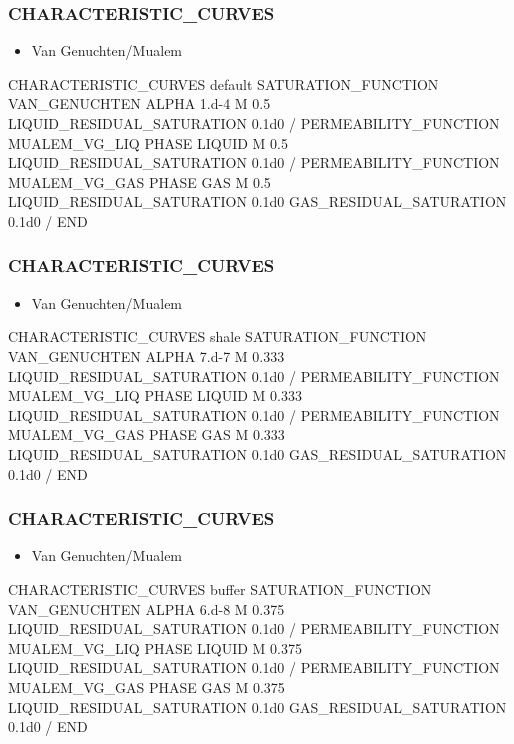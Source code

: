 \documentclass{beamer}
\newcommand\greencomment[1]{{{\color{green} #1}}}
\begin{document}
\begin{frame}\frametitle{CHARACTERISTIC\_CURVES}
\begin{itemize}
  \item Van Genuchten/Mualem
\end{itemize}
\begin{semiverbatim}\small
CHARACTERISTIC_CURVES \greencomment{default}
  SATURATION_FUNCTION VAN_GENUCHTEN
    ALPHA 1.d-4
    M 0.5
    LIQUID_RESIDUAL_SATURATION 0.1d0
  /
  PERMEABILITY_FUNCTION MUALEM_VG_LIQ
    PHASE LIQUID
    M 0.5
    LIQUID_RESIDUAL_SATURATION 0.1d0
  /
  PERMEABILITY_FUNCTION MUALEM_VG_GAS
    PHASE GAS
    M 0.5
    LIQUID_RESIDUAL_SATURATION 0.1d0
    GAS_RESIDUAL_SATURATION 0.1d0
  /
END
\end{semiverbatim}
\end{frame}

\begin{frame}\frametitle{CHARACTERISTIC\_CURVES}
\begin{itemize}
  \item Van Genuchten/Mualem
\end{itemize}
\begin{semiverbatim}\small
CHARACTERISTIC_CURVES \greencomment{shale}
  SATURATION_FUNCTION VAN_GENUCHTEN
    ALPHA 7.d-7
    M 0.333
    LIQUID_RESIDUAL_SATURATION 0.1d0
  /
  PERMEABILITY_FUNCTION MUALEM_VG_LIQ
    PHASE LIQUID
    M 0.333
    LIQUID_RESIDUAL_SATURATION 0.1d0
  /
  PERMEABILITY_FUNCTION MUALEM_VG_GAS
    PHASE GAS
    M 0.333
    LIQUID_RESIDUAL_SATURATION 0.1d0
    GAS_RESIDUAL_SATURATION 0.1d0
  /
END
\end{semiverbatim}
\end{frame}

\begin{frame}\frametitle{CHARACTERISTIC\_CURVES}
\begin{itemize}
  \item Van Genuchten/Mualem
\end{itemize}
\begin{semiverbatim}\small
CHARACTERISTIC_CURVES \greencomment{buffer}
  SATURATION_FUNCTION VAN_GENUCHTEN
    ALPHA 6.d-8
    M 0.375
    LIQUID_RESIDUAL_SATURATION 0.1d0
  /
  PERMEABILITY_FUNCTION MUALEM_VG_LIQ
    PHASE LIQUID
    M 0.375
    LIQUID_RESIDUAL_SATURATION 0.1d0
  /
  PERMEABILITY_FUNCTION MUALEM_VG_GAS
    PHASE GAS
    M 0.375
    LIQUID_RESIDUAL_SATURATION 0.1d0
    GAS_RESIDUAL_SATURATION 0.1d0
  /
END
\end{semiverbatim}
\end{frame}
\end{document}
